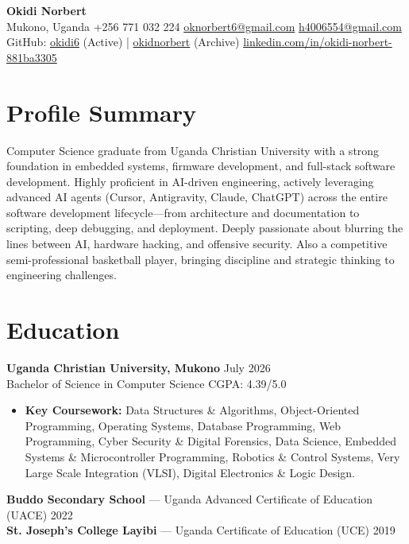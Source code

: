 \documentclass[a4paper,10pt]{article}
\begin{document}
\begin{center}
    {\huge \textbf{Okidi Norbert}} \\
    Mukono, Uganda \textbullet{} +256 771 032 224 \textbullet{} \href{mailto:oknorbert6@gmail.com}{oknorbert6@gmail.com} \textbullet{} \href{mailto:h4006554@gmail.com}{h4006554@gmail.com} \\
    GitHub: \href{https://github.com/okidi6}{okidi6} (Active) | \href{https://github.com/okidnorbert}{okidnorbert} (Archive) \textbullet{} \href{https://www.linkedin.com/in/okidi-norbert-881ba3305}{linkedin.com/in/okidi-norbert-881ba3305}
\end{center}

\section{Profile Summary}
Computer Science graduate from Uganda Christian University with a strong foundation in embedded systems, firmware development, and full-stack software development. Highly proficient in AI-driven engineering, actively leveraging advanced AI agents (Cursor, Antigravity, Claude, ChatGPT) across the entire software development lifecycle—from architecture and documentation to scripting, deep debugging, and deployment. Deeply passionate about blurring the lines between AI, hardware hacking, and offensive security. Also a competitive semi-professional basketball player, bringing discipline and strategic thinking to engineering challenges.

\section{Education}
\textbf{Uganda Christian University, Mukono} \hfill July 2026 \\
Bachelor of Science in Computer Science \hfill CGPA: 4.39/5.0
\begin{itemize}[leftmargin=*]
    \item \textbf{Key Coursework:} Data Structures \& Algorithms, Object-Oriented Programming, Operating Systems, Database Programming, Web Programming, Cyber Security \& Digital Forensics, Data Science, Embedded Systems \& Microcontroller Programming, Robotics \& Control Systems, Very Large Scale Integration (VLSI), Digital Electronics \& Logic Design.
\end{itemize}

\textbf{Buddo Secondary School} --- Uganda Advanced Certificate of Education (UACE) \hfill 2022 \\
\textbf{St. Joseph's College Layibi} --- Uganda Certificate of Education (UCE) \hfill 2019
\end{document}
